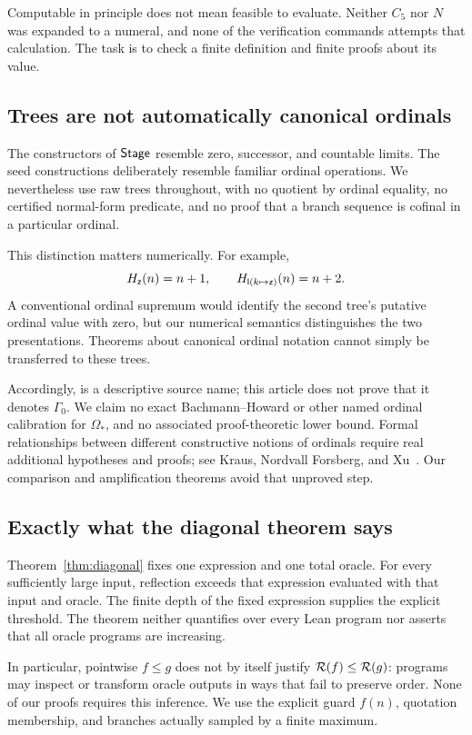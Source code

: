Computable in principle does not mean feasible to evaluate. Neither
\(C_5\) nor \(N\) was expanded to a numeral, and none of the verification
commands attempts that calculation. The task is to check a finite
definition and finite proofs about its value.

\subsection{Trees are not automatically canonical ordinals}
The constructors of \(\mathsf{Stage}\) resemble zero, successor, and countable
limits. The seed constructions deliberately resemble familiar
ordinal operations. We nevertheless use raw trees throughout,
with no quotient by ordinal equality, no certified normal-form
predicate, and no proof that a branch sequence is cofinal in a
particular ordinal.

This distinction matters numerically. For example,
\[
 H_{\mathsf z}(n)=n+1,\qquad
 H_{\mathsf l(k\mapsto\mathsf z)}(n)=n+2.
\]
A conventional ordinal supremum would identify the second tree's
putative ordinal value with zero, but our numerical semantics
distinguishes the two presentations. Theorems about canonical
ordinal notation cannot simply be transferred to these trees.

Accordingly,  is a descriptive source name; this
article does not prove that it denotes \(\Gamma_0\).
We claim no exact Bachmann--Howard or other named ordinal calibration
for \(\Omega_*\), and no associated proof-theoretic lower bound.
Formal relationships between different constructive notions of
ordinals require real additional hypotheses and proofs; see
Kraus, Nordvall Forsberg, and Xu~\cite{constructive-ordinals}.
Our comparison and amplification theorems avoid that unproved step.

\subsection{Exactly what the diagonal theorem says}
Theorem~\ref{thm:diagonal} fixes one expression and one total oracle.
For every sufficiently large input, reflection exceeds that
expression evaluated with that input and oracle. The finite depth
of the fixed expression supplies the explicit threshold.
The theorem neither quantifies over every Lean program nor asserts
that all oracle programs are increasing.

In particular, pointwise \(f\le g\) does not by itself justify
\(\mathcal R(f)\le\mathcal R(g)\): programs may inspect or transform oracle outputs
in ways that fail to preserve order. None of our proofs requires
this inference. We use the explicit guard \(f(n)\), quotation
membership, and branches actually sampled by a finite maximum.

